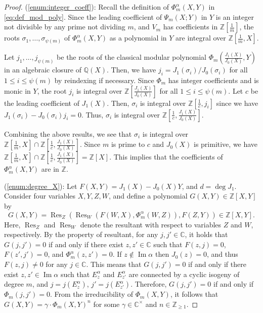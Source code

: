 \documentclass[10pt,a4paper]{amsart}
\newcommand{\Comp}{\mathbb{C}}
\newcommand{\Q}{\mathbb{Q}}
\newcommand{\Z}{\mathbb{Z}}
\newcommand{\image}{\operatorname{Im}}
\newcommand{\res}{\operatorname{Res}}
\begin{document}
\begin{proof}
    (\ref{enum:integer_coeff}):
    Recall the definition of $\Phi_m^{\alpha}(X, Y)$ in \eqref{eq:def_mod_poly}.
    Since the leading coefficient of $\Psi_m(X; Y)$ in $Y$ is an integer not divisible by any prime not dividing $m$,
    and $V_m$ has coefficients in $\Z\left[\frac{1}{m}\right]$,
    the roots $\sigma_1, \dots, \sigma_{\psi(m)}$ of $\Phi_m^{\alpha}(X, Y)$
    as a polynomial in $Y$
    are integral over $\Z\left[\frac{1}{m}, X\right]$.

    Let $j_1, \dots, j_{\psi(m)}$ be the roots of
    the classical modular polynomial $\Phi_m\left(\frac{J_1(X)}{J_0(X)}, Y\right)$
    in an algebraic closure of $\Q(X)$.
    Then, we have $j_i = J_1(\sigma_i)/J_0(\sigma_i)$ for all $1 \leq i \leq \psi(m)$
    by reindexing if necessary.
    Since $\Phi_m$ has integer coefficients and is monic in $Y$,
    the root $j_i$ is integral over $\Z\left[\frac{J_1(X)}{J_0(X)}\right]$ for all $1 \leq i \leq \psi(m)$.
    Let $c$ be the leading coefficient of $J_1(X)$.
    Then, $\sigma_i$ is integral over $\Z\left[\frac{1}{c}, j_i\right]$
    since we have $J_1(\sigma_i) - J_0(\sigma_i) j_i = 0$.
    Thus, 
    $\sigma_i$ is integral over $\Z\left[\frac{1}{c}, \frac{J_1(X)}{J_0(X)}\right]$.

    Combining the above results,
    we see that $\sigma_i$ is integral over $\Z\left[\frac{1}{m}, X\right] \cap \Z\left[\frac{1}{c}, \frac{J_1(X)}{J_0(X)}\right]$.
    Since $m$ is prime to $c$ and $J_0(X)$ is primitive,
    we have $\Z\left[\frac{1}{m}, X\right] \cap \Z\left[\frac{1}{c}, \frac{J_1(X)}{J_0(X)}\right] = \Z[X]$.
    This implies that the coefficients of $\Phi_m^{\alpha}(X, Y)$ are in $\Z$.

    (\ref{enum:degree_X}):
    Let $F(X, Y) = J_1(X) - J_0(X) Y$,
    and $d = \deg J_1$.
    Consider four variables $X, Y, Z, W$,
    and define a polynomial $G(X, Y) \in \Z[X, Y]$ by
    \begin{equation*}
        G(X, Y) = \res_Z(\res_W(F(W, X), \Phi_m^\alpha(W, Z)), F(Z, Y)) \in \Z[X, Y].
    \end{equation*}
    Here, $\res_Z$ and $\res_W$ denote the resultant with respect to
    variables $Z$ and $W$, respectively.
    By the property of resultant,
    for any $j, j' \in \Comp$,
    it holds that $G(j, j') = 0$
    if and only if there exist $z, z' \in \Comp$
    such that $F(z, j) = 0$, $F(z', j') = 0$,
    and $\Phi_m^\alpha(z, z') = 0$.
    If $z \not\in \image \alpha$ then $J_0(z) = 0$,
    and thus $F(z, j) \neq 0$ for any $j \in \Comp$.
    This means that $G(j, j') = 0$ if and only if
    there exist $z, z' \in \image \alpha$
    such that $E_z^\alpha$ and $E_{z'}^\alpha$ are connected by
    a cyclic isogeny of degree $m$,
    and $j = j(E_z^\alpha)$, $j' = j(E_{z'}^\alpha)$.
    Therefore, $G(j, j') = 0$ if and only if $\Phi_m(j, j') = 0$.
    From the irreducibility of $\Phi_m(X, Y)$,
    it follows that $G(X, Y) = \gamma \cdot \Phi_m(X, Y)^n$ for some $\gamma \in \Comp^\times$ and $n \in \Z_{\geq 1}$.


\end{proof}
\end{document}
